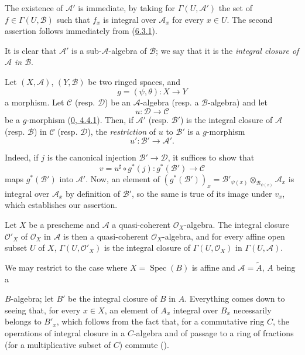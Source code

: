 The existence of $\mathcal{A}'$ is immediate, by taking for
$\Gamma(U,\mathcal{A}')$ the set of $f\in\Gamma(U,\mathcal{B})$ such that
$f_x$ is integral over $\mathcal{A}_x$ for every $x\in U$. The second
assertion follows immediately from (\hyperref[II.6.3.1]{6.3.1}).

It is clear that $\mathcal{A}'$ is a sub-$\mathcal{A}$-algebra of
$\mathcal{B}$; we say that it is the \emph{integral closure of
$\mathcal{A}$ in $\mathcal{B}$}.

\begin{env}[6.3.3]
\label{II.6.3.3}
Let $(X,\mathcal{A})$, $(Y,\mathcal{B})$ be two ringed spaces, and
\[
g=(\psi,\theta):X\to Y
\]
a morphism. Let $\mathcal{C}$ (resp. $\mathcal{D}$) be an
$\mathcal{A}$-algebra (resp. a $\mathcal{B}$-algebra) and let
\[
u:\mathcal{D}\to\mathcal{C}
\]
be a $g$-morphism (\hyperref[0.4.4.1]{0, 4.4.1}). Then, if
$\mathcal{A}'$ (resp. $\mathcal{B}'$) is the integral closure of
$\mathcal{A}$ (resp. $\mathcal{B}$) in $\mathcal{C}$ (resp.
$\mathcal{D}$), the \emph{restriction} of $u$ to $\mathcal{B}'$ is a
$g$-morphism
\[
u':\mathcal{B}'\to\mathcal{A}'.
\]

Indeed, if $j$ is the canonical injection $\mathcal{B}'\to\mathcal{D}$, it
suffices to show that
\[
v=u^\sharp\circ g^*(j):g^*(\mathcal{B}')\to\mathcal{C}
\]
maps $g^*(\mathcal{B}')$ into $\mathcal{A}'$. Now, an element of
$(g^*(\mathcal{B}'))_x=\mathcal{B}'_{\psi(x)}\otimes_{\mathcal{B}_{\psi(x)}}
\mathcal{A}_x$ is integral over $\mathcal{A}_x$ by definition of
$\mathcal{B}'$, so the same is true of its image under $v_x$, which
establishes our assertion.
\end{env}

\begin{proposition}[6.3.4]
\label{II.6.3.4}
Let $X$ be a prescheme and $\mathcal{A}$ a quasi-coherent
$\mathcal{O}_X$-algebra. The integral closure $\mathcal{O}'_X$ of
$\mathcal{O}_X$ in $\mathcal{A}$ is then a quasi-coherent
$\mathcal{O}_X$-algebra, and for every affine open subset $U$ of $X$,
$\Gamma(U,\mathcal{O}'_X)$ is the integral closure of
$\Gamma(U,\mathcal{O}_X)$ in $\Gamma(U,\mathcal{A})$.
\end{proposition}

We may restrict to the case where $X=\operatorname{Spec}(B)$ is affine and
$\mathcal{A}=\widetilde{A}$, $A$ being a


$B$-algebra; let $B'$ be the integral closure of $B$ in $A$. Everything comes
down to seeing that, for every $x\in X$, an element of $A_x$ integral over
$B_x$ necessarily belongs to $B'_x$, which follows from the fact that, for a
commutative ring $C$, the operations of integral closure in a $C$-algebra and
of passage to a ring of fractions (for a multiplicative subset of $C$)
commute (\cite[vol.~I, pp.~261 and 257]{I-13}).

